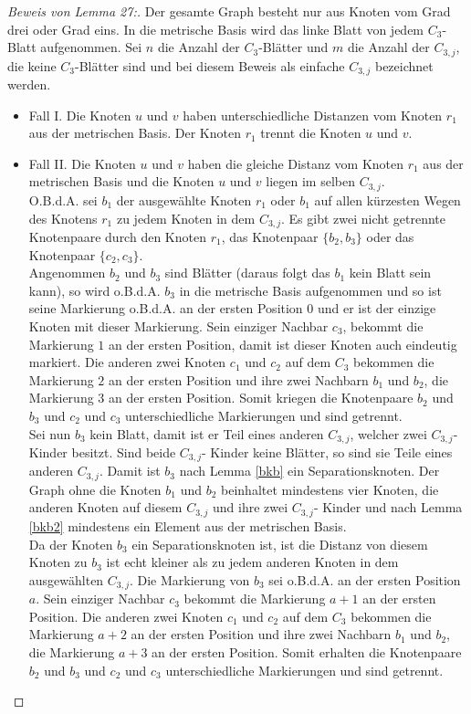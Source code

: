 \begin{proof}[Beweis von Lemma 27:]
Der gesamte Graph besteht nur aus Knoten vom Grad drei oder Grad eins. In die metrische Basis wird das linke Blatt von jedem $C_{3}$-Blatt aufgenommen. Sei $n$ die Anzahl der $C_{3}$-Blätter und $m$ die Anzahl der $C_{3,j}$, die keine $C_{3}$-Blätter sind und bei diesem Beweis als einfache $C_{3,j}$ bezeichnet werden.
\begin{itemize}
\item Fall I. Die Knoten $u$ und $v$ haben unterschiedliche Distanzen vom Knoten $r_1$ aus der metrischen Basis. Der Knoten $r_1$ trennt die Knoten $u$ und $v$.
\item Fall II. Die Knoten $u$ und $v$ haben die gleiche Distanz vom Knoten $r_1$ aus der metrischen Basis und die Knoten $u$ und $v$ liegen im selben $C_{3,j}$.\\
O.B.d.A. sei $b_1$ der ausgewählte Knoten $r_1$ oder $b_1$ auf allen kürzesten Wegen des Knotens $r_1$ zu jedem Knoten in dem $C_{3,j}$. Es gibt zwei nicht getrennte Knotenpaare durch den Knoten $r_1$, das Knotenpaar $\{b_2,b_3\}$ oder das Knotenpaar $\{c_2,c_3\}$.\\
Angenommen $b_2$ und $b_3$ sind Blätter (daraus folgt das $b_1$ kein Blatt sein kann), so wird o.B.d.A. $b_3$ in die metrische Basis aufgenommen und so ist seine Markierung o.B.d.A. an der ersten Position $0$ und er ist der einzige Knoten mit dieser Markierung. Sein einziger Nachbar $c_3$, bekommt die Markierung $1$ an der ersten Position, damit ist dieser Knoten auch eindeutig markiert. Die anderen zwei Knoten $c_1$ und $c_2$ auf dem $C_3$ bekommen die Markierung $2$ an der ersten Position und ihre zwei Nachbarn $b_1$ und $b_2$, die Markierung $3$ an der ersten Position. Somit kriegen die Knotenpaare $b_2$ und $b_3$ und $c_2$ und $c_3$ unterschiedliche Markierungen und sind getrennt.\\ 	 
Sei nun $b_3$ kein Blatt, damit ist er Teil eines anderen $C_{3,j}$, welcher zwei $C_{3,j}$-Kinder besitzt. Sind beide $C_{3,j}$- Kinder keine Blätter, so sind sie Teile eines anderen $C_{3,j}$. Damit ist $b_3$ nach Lemma \ref{bkb} ein Separationsknoten. Der Graph ohne die Knoten $b_1$ und $b_2$ beinhaltet mindestens vier Knoten, die anderen Knoten auf diesem $C_{3,j}$ und ihre zwei $C_{3,j}$- Kinder und nach Lemma \ref{bkb2} mindestens ein Element aus der metrischen Basis.\\
Da der Knoten $b_3$ ein Separationsknoten ist, ist die Distanz von diesem Knoten zu $b_3$ ist echt kleiner als zu jedem anderen Knoten in dem ausgewählten $C_{3,j}$. Die Markierung von $b_3$ sei o.B.d.A. an der ersten Position $a$. Sein einziger Nachbar $c_3$ bekommt die Markierung $a+1$ an der ersten Position. Die anderen zwei Knoten $c_1$ und $c_2$ auf dem $C_3$ bekommen die Markierung $a+2$ an der ersten Position und ihre zwei Nachbarn $b_1$ und $b_2$, die Markierung $a+3$ an der ersten Position. Somit erhalten die Knotenpaare $b_2$ und $b_3$ und $c_2$ und $c_3$ unterschiedliche Markierungen und sind getrennt.

\end{itemize}
\end{proof}
